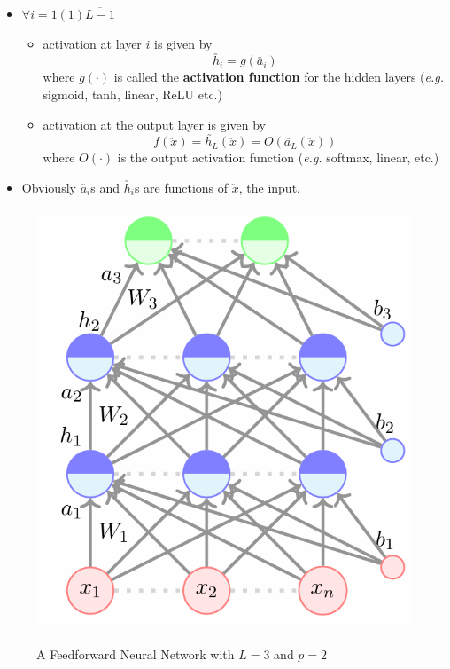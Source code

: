 \documentclass[11pt, a4paper]{article}
\begin{document}
\begin{itemize}
\item $\forall i = 1(1)\overline{L-1}$
	\begin{itemize}
	\item activation at layer $i$ is given by
	$$\utilde{h_i} = g(\utilde{a_i})$$
	where $g(\cdot)$ is called the \textbf{activation function} for the hidden layers (\textit{e.g.} sigmoid, tanh, linear, ReLU etc.)
	
	\item activation at the output layer is given by
	$$ f(\utilde{x}) = \utilde{h_L}(\utilde{x}) = O(\utilde{a_L}(\utilde{x})) $$
	where $O(\cdot)$ is the output activation function (\textit{e.g.} softmax, linear, etc.)
	\end{itemize}

\item Obviously $\utilde{a_i}$s and $\utilde{h_i}$s are functions of $\utilde{x}$, the input.

\end{itemize}

\begin{figure}[!htbp]
\centering
\caption{A Feedforward Neural Network with $L = 3$ and $p = 2$}
\includegraphics[scale=0.7]{image_1}
\label{fig:1}
\end{figure}
\end{document}

